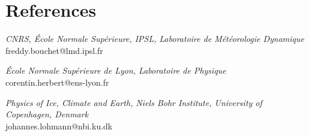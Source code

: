 \documentclass[11pt, a4 paper]{article}
\begin{document}
\section*{References}
\begin{description}[style=multiline,leftmargin=4cm,align=right]
  \item[Freddy Bouchet]
    \emph{CNRS, \'Ecole Normale Sup\'erieure, IPSL, Laboratoire de M\'et\'eorologie Dynamique} \\
    freddy.bouchet@lmd.ipsl.fr
  \item[Corentin Herbert]
    \emph{\'Ecole Normale Sup\'erieure de Lyon, Laboratoire de Physique} \\
    corentin.herbert@ens-lyon.fr
  \item[Johannes Lohmann]
    \emph{Physics of Ice, Climate and Earth, Niels Bohr Institute,
    University of Copenhagen, Denmark} \\
    johannes.lohmann@nbi.ku.dk

\end{description}

% 
% 
% 
\end{document}
